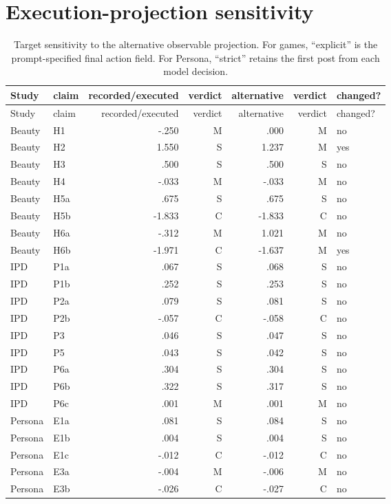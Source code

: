 \documentclass[10pt]{article}
\begin{document}
\section{Execution-projection sensitivity}
\begin{landscape}
\small
\begin{longtable}{@{}llrrrrl@{}}
\caption{Target sensitivity to the alternative observable projection. For games, ``explicit'' is the prompt-specified final action field. For Persona, ``strict'' retains the first post from each model decision.}\\
\toprule
Study & claim & recorded/executed & verdict & alternative & verdict & changed? \\
\midrule
\endfirsthead
\toprule
Study & claim & recorded/executed & verdict & alternative & verdict & changed? \\
\midrule
\endhead
Beauty & H1 & -.250 & M & .000 & M & no \\
Beauty & H2 & 1.550 & S & 1.237 & M & yes \\
Beauty & H3 & .500 & S & .500 & S & no \\
Beauty & H4 & -.033 & M & -.033 & M & no \\
Beauty & H5a & .675 & S & .675 & S & no \\
Beauty & H5b & -1.833 & C & -1.833 & C & no \\
Beauty & H6a & -.312 & M & 1.021 & M & no \\
Beauty & H6b & -1.971 & C & -1.637 & M & yes \\
IPD & P1a & .067 & S & .068 & S & no \\
IPD & P1b & .252 & S & .253 & S & no \\
IPD & P2a & .079 & S & .081 & S & no \\
IPD & P2b & -.057 & C & -.058 & C & no \\
IPD & P3 & .046 & S & .047 & S & no \\
IPD & P5 & .043 & S & .042 & S & no \\
IPD & P6a & .304 & S & .304 & S & no \\
IPD & P6b & .322 & S & .317 & S & no \\
IPD & P6c & .001 & M & .001 & M & no \\
Persona & E1a & .081 & S & .084 & S & no \\
Persona & E1b & .004 & S & .004 & S & no \\
Persona & E1c & -.012 & C & -.012 & C & no \\
Persona & E3a & -.004 & M & -.006 & M & no \\
Persona & E3b & -.026 & C & -.027 & C & no \\
\bottomrule
\end{longtable}
\end{landscape}
\end{document}
